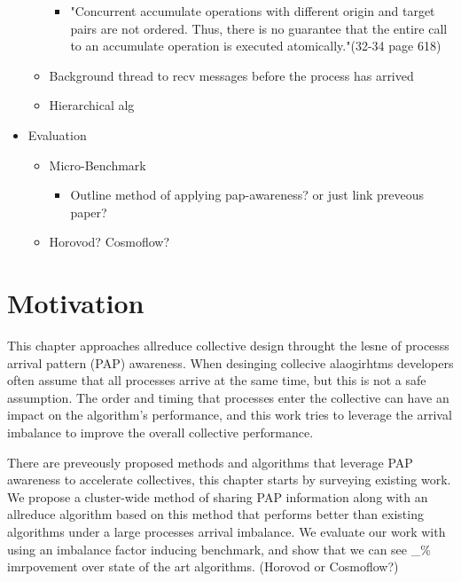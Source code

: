 \begin{itemize}
\begin{itemize}
        \begin{itemize}
            \item "Concurrent accumulate operations with different origin and target pairs are
not ordered. Thus, there is no guarantee that the entire call to an accumulate operation is
executed atomically."(32-34 page 618)
        \end{itemize}
        \item Background thread to recv messages before the process has arrived 
        \item Hierarchical alg 
    \end{itemize}
    \item Evaluation
    \begin{itemize}
        \item Micro-Benchmark
            \begin{itemize}
                \item Outline method of applying pap-awareness? or just link preveous paper?
            \end{itemize}
        \item Horovod? Cosmoflow?
    \end{itemize}
\end{itemize}

\section{Motivation}

This chapter approaches allreduce collective design throught the lesne of processs arrival pattern (PAP) awareness. 
When desinging collecive alaogirhtms developers often assume that all processes arrive at the same time, but this is not a safe assumption.
The order and timing that processes enter the collective can have an impact on the algorithm's performance, and this work tries to leverage the arrival imbalance to improve the overall collective performance.

There are preveously proposed methods and algorithms that leverage PAP awareness to accelerate collectives, this chapter starts by surveying existing work.
We propose a cluster-wide method of sharing PAP information along with an allreduce algorithm based on this method that performs better than existing algorithms under a large processes arrival imbalance.
We evaluate our work with using an imbalance factor inducing benchmark, and show that we can see \_\% imrpovement over state of the art algorithms.  
(Horovod or Cosmoflow?)

